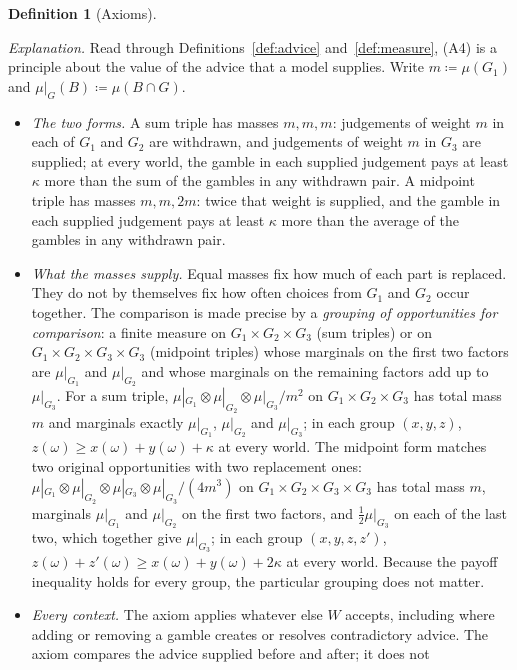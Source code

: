 \documentclass[11pt]{article}
\theoremstyle{plain}
\theoremstyle{definition}
\newtheorem{definition}[theorem]{Definition}
\begin{document}
\begin{definition}[Axioms]
\begin{itemize}[leftmargin=3.2em]
  \emph{Explanation.} Read through Definitions~\ref{def:advice} and~\ref{def:measure}, (A4) is a principle about the value of the advice that a model
  supplies. Write $m\coloneqq\mu(G_1)$ and $\mu|_G(B)\coloneqq\mu(B\cap G)$.
  \begin{itemize}[leftmargin=1.2em]
    \item \emph{The two forms.} A sum triple has masses $m,m,m$: judgements of weight $m$ in
    each of $G_1$ and $G_2$ are withdrawn, and judgements of weight $m$ in $G_3$ are supplied;
    at every world, the gamble in each supplied judgement pays at least $\kappa$ more than the
    sum of the gambles in any withdrawn pair. A midpoint triple has masses $m,m,2m$: twice that
    weight is supplied, and the gamble in each supplied judgement pays at least $\kappa$ more
    than the average of the gambles in any withdrawn pair.
    \item \emph{What the masses supply.} Equal masses fix how much of each part is replaced.
    They do not by themselves fix how often choices from $G_1$ and $G_2$ occur together. The
    comparison is made precise by a \emph{grouping of opportunities for comparison}: a finite
    measure on $G_1\times G_2\times G_3$ (sum triples) or on $G_1\times G_2\times G_3\times
    G_3$ (midpoint triples) whose marginals on the first two factors are $\mu|_{G_1}$ and
    $\mu|_{G_2}$ and whose marginals on the remaining factors add up to $\mu|_{G_3}$.
    For a sum triple, $\mu|_{G_1}\otimes\mu|_{G_2}\otimes\mu|_{G_3}/m^2$ on $G_1\times G_2\times
    G_3$ has total mass $m$ and marginals exactly $\mu|_{G_1}$, $\mu|_{G_2}$ and $\mu|_{G_3}$;
    in each group $(x,y,z)$, $z(\omega)\ge x(\omega)+y(\omega)+\kappa$ at every world. The
    midpoint form matches two original opportunities with two replacement ones:
    $\mu|_{G_1}\otimes\mu|_{G_2}\otimes\mu|_{G_3}\otimes\mu|_{G_3}/(4m^3)$ on $G_1\times
    G_2\times G_3\times G_3$ has total mass $m$, marginals $\mu|_{G_1}$ and $\mu|_{G_2}$ on the
    first two factors, and $\tfrac12\mu|_{G_3}$ on each of the last two, which together give
    $\mu|_{G_3}$; in each group $(x,y,z,z')$, $z(\omega)+z'(\omega)\ge x(\omega)+y(\omega)+
    2\kappa$ at every world. Because the payoff inequality holds for every group, the particular
    grouping does not matter.
    \item \emph{Every context.} The axiom applies whatever else $W$ accepts, including where
    adding or removing a gamble creates or resolves contradictory advice. The axiom compares the
    advice supplied before and after; it does not

\end{itemize}
\end{itemize}
\end{definition}
\end{document}
